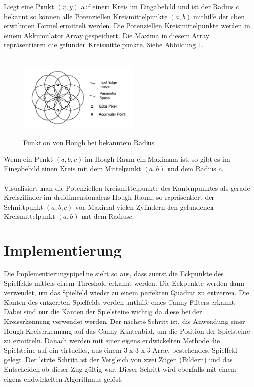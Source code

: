 \documentclass[paper=A4, deutsch]{scrartcl}
\begin{document}
Liegt eine Punkt \((x,y)\) auf einem Kreis im Eingabebild und ist der Radius \(c\) bekannt so k\"onnen alle Potenziellen Kreismittelpunkte \((a,b)\) mithilfe der oben erwähnten Formel ermittelt werden. Die Potenziellen Kreismittelpunkte werden in einem Akkumulator Array gespeichert. Die Maxima in diesem Array repräsentieren die gefunden Kreismittelpunkte. Siehe Abbildung \ref{fig:hough2d}.\\
\\
\begin{figure}[ht]
	\centering
		\includegraphics[width=6cm]{2dhough_darstellung.png}\\
	\caption[Funktion von Hough bei bekanntem Radius]{Funktion von Hough bei bekanntem Radius}
	\label{fig:hough2d}
\end{figure}

Wenn ein Punkt \((a,b,c)\) im Hough-Raum ein Maximum ist, so gibt es im Eingabebild einen Kreis mit dem Mittelpunkt \((a,b)\) und dem Radius  \(c\).
\\
\\
Visualisiert man die Potenziellen Kreismittelpunkte des Kantenpunktes als gerade Kreiszilinder im dreidimensionalens Hough-Raum, so repräsentiert der Schnittpunkt \((a,b,c)\) von Maximal vielen Zylindern den gefundenen Kreismittelpunkt \((a,b)\) mit dem Radius\( c\).







\section{Implementierung}
Die Implementierungspipeline sieht so aus, dass zuerst die Eckpunkte des Spielfelds mittels  einem Threshold erkannt werden. Die Eckpunkte werden dann verwendet, um das Spielfeld wieder zu einem perfekten Quadrat zu entzerren. Die Kanten des entzerrten Spielfelds werden mithilfe eines Canny Filters erkannt. Dabei sind nur die Kanten der Spielsteine wichtig da diese bei der Kreiserkennung verwendet werden. Der nächste Schritt ist, die Anwendung einer Hough Kreiserkennung auf das Canny Kantenbild, um die Position der Spielsteine zu ermitteln. Danach werden mit einer eigens endwickelten Methode die Spielsteine auf ein virtuelles, aus einem 3 x 3 x 3 Array bestehendes, Spielfeld gelegt. Der letzte Schritt ist der Vergleich von zwei Zügen (Bildern) und das Entscheiden ob dieser Zug gültig war. Dieser Schritt wird ebenfalls mit einem eigens endwickelten Algorithmus gelöst.
\end{document}
